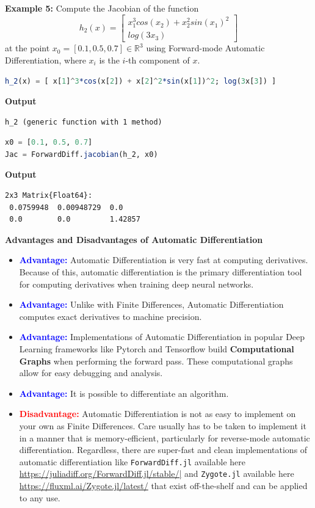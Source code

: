 \textbf{Example 5:} Compute the Jacobian of the function 
$$ h_2(x) = \begin{bmatrix} x_1^3cos(x_2) + x_2^2sin(x_1)^2 \\
      log(3x_3) \end{bmatrix}$$ 
at the point $x_0 = [0.1, 0.5, 0.7] \in \mathbb{R}^3$
using Forward-mode Automatic Differentiation, 
where $x_i$ is the $i$-{th} component of $x$.

\begin{lstlisting}[language=Julia,style=mystyle]
h_2(x) = [ x[1]^3*cos(x[2]) + x[2]^2*sin(x[1])^2; log(3x[3]) ]
\end{lstlisting}
\textbf{Output} 
\begin{verbatim}
h_2 (generic function with 1 method)
\end{verbatim}

\begin{lstlisting}[language=Julia,style=mystyle]
x0 = [0.1, 0.5, 0.7]
Jac = ForwardDiff.jacobian(h_2, x0)
\end{lstlisting}
\textbf{Output} 
\begin{verbatim}
2x3 Matrix{Float64}:
 0.0759948  0.00948729  0.0
 0.0        0.0         1.42857
\end{verbatim}

\begin{center} \bf Advantages and Disadvantages of Automatic Differentiation
\end{center}


\begin{itemize}
    \item \textcolor{blue}{\bf Advantage:} Automatic Differentiation is very fast at computing derivatives. Because of this, automatic differentiation is the primary differentiation tool for computing derivatives when training deep neural networks.
\item \textcolor{blue}{\bf Advantage:} Unlike with Finite Differences, Automatic Differentiation computes exact derivatives to machine precision.
\item \textcolor{blue}{\bf Advantage:} Implementations of Automatic Differentiation in popular Deep Learning frameworks like Pytorch and Tensorflow build \textbf{Computational Graphs} when performing the forward pass. These computational graphs allow for easy debugging and analysis.

\item \textcolor{blue}{\bf Advantage:} It is possible to differentiate an algorithm. 

    \item \textcolor{red}{\bf Disadvantage:} Automatic Differentiation is not as easy to implement on your own as Finite Differences. Care usually has to be taken to implement it in a manner that is memory-efficient, particularly for reverse-mode automatic differentiation. Regardless, there are super-fast and clean implementations of automatic differentiation like \texttt{ForwardDiff.jl} 
 available here \url{https://juliadiff.org/ForwardDiff.jl/stable/|} and \texttt{Zygote.jl} available here \url{https://fluxml.ai/Zygote.jl/latest/} that exist off-the-shelf and can be applied to any use. 
\end{itemize}

